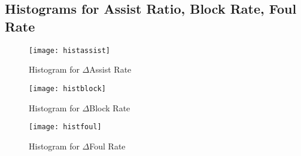 \documentclass{article}
\begin{document}
\subsection{Histograms for Assist Ratio, Block Rate, Foul Rate}
\begin{figure}[H]
    \centering
    \label{fighistass}
    \texttt{[image: histassist]}
    \caption{Histogram for $\Delta$Assist Rate}
\end{figure}
\begin{figure}[H]
    \centering
    \label{fighistblk}
    \texttt{[image: histblock]}
    \caption{Histogram for $\Delta$Block Rate}
\end{figure}
\begin{figure}[H]
    \centering
    \label{fighistpfl}
    \texttt{[image: histfoul]}
    \caption{Histogram for $\Delta$Foul Rate}
\end{figure}
\end{document}
